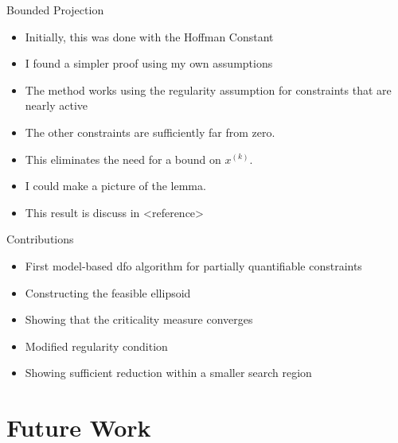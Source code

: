 \documentclass{beamer}
\newcommand{\xk}{{{x}^{(k)}}}
\begin{document}
\begin{frame}{Bounded Projection}
\begin{itemize}
\item Initially, this was done with the Hoffman Constant
\item I found a simpler proof using my own assumptions
\item The method works using the regularity assumption for constraints that are nearly active
\item The other constraints are sufficiently far from zero.
\item This eliminates the need for a bound on $\xk$.
\color{red}
\item I could make a picture of the lemma.
\color{black}
\item This result is discuss in <reference>
\end{itemize}
\end{frame}



\begin{frame}{Contributions}
	\begin{itemize}
		\item First model-based dfo algorithm for partially quantifiable constraints
		\item Constructing the feasible ellipsoid
		\item Showing that the criticality measure converges
		\item Modified regularity condition
		\item Showing sufficient reduction within a smaller search region
	\end{itemize}
\end{frame}



\section{Future Work}


\end{document}
